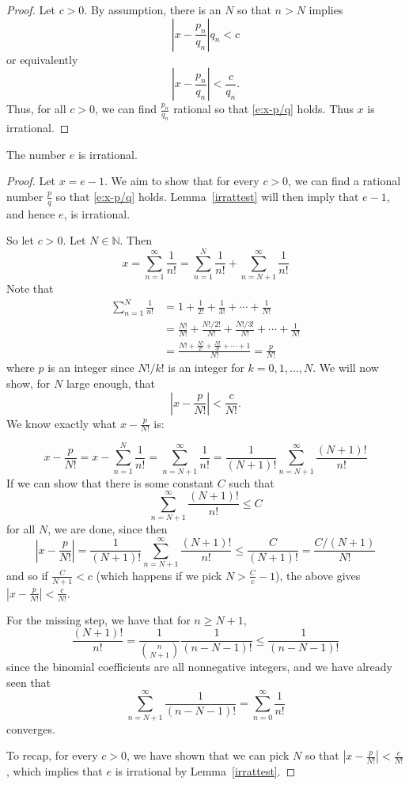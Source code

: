 \documentclass[11pt,dvipsnames]{book}
\numberwithin{equation}{section} %
\numberwithin{figure}{section} %
\numberwithin{table}{section} %
\begin{document}
\begin{proof}
Let $c>0$. By assumption,
there is an $N$ so that $n> N$ implies 
\[
\left|x-\frac{p_{n}}{q_{n}}\right|q_n<c \]
or equivalently
\[\left|x-\frac{p_{n}}{q_{n}}\right| < \frac{c}{q_n}.
\]
Thus, for all $c>0$, we can find $\frac{p_n}{q_n}$ rational so that \eqref{e:x-p/q} holds. Thus $x$ is irrational.
\end{proof}

\begin{theorem}
The number $e$ is irrational. 
\end{theorem}

\begin{proof}
Let $x = e-1$. We aim to show that for every $c>0$, we can find a rational number $\frac{p}{q}$ so that \eqref{e:x-p/q} holds. Lemma~\ref{irrattest} will then imply that $e-1$, and hence $e$, is irrational.

So let $c>0$. Let $N\in\mathbb{N}$. Then
\[
x=\sum_{n=1}^{\infty} \frac{1}{n!}
=\sum_{n=1}^{N}\frac{1}{n!} + \sum_{n=N+1}^{\infty}\frac{1}{n!}
\]
Note that 
\begin{align*}
\sum_{n=1}^{N}\frac{1}{n!} 
& =1+\frac{1}{2!}+\frac{1}{3!}+\cdots + \frac{1}{N!}\\
& = \frac{N!}{N!}+\frac{N!/2!}{N!}+\frac{N!/3!}{N!}+\cdots + \frac{1}{N!}\\
& = \frac{N!+\frac{N!}{2!}+\frac{N!}{3!}+\cdots + 1}{N!} = \frac{p}{N!}
\end{align*}
where $p$ is an integer since $N!/k!$ is an integer for $k=0,1,...,N$. We will now show, for $N$ large enough, that 
\[
\left| x-\frac{p}{N!}\right|<\frac{c}{N!}.\]
We know exactly what $x-\frac{p}{N!}$ is:

\[
x-\frac{p}{N!}
=x-\sum_{n=1}^{N}\frac{1}{n!} 
=\sum_{n=N+1}^{\infty}\frac{1}{n!}
=\frac{1}{(N+1)!}\sum_{n=N+1}^{\infty}\frac{(N+1)!}{n!}
\]
If we can show that there is some constant $C$ such that \[\sum_{n=N+1}^{\infty}\frac{(N+1)!}{n!} \leq C\]
for all $N$, we are done, since then
\[
\left|x-\frac{p}{N!}\right|
=\frac{1}{(N+1)!}\sum_{n=N+1}^{\infty}\frac{(N+1)!}{n!}
\leq \frac{C}{(N+1)!}=\frac{C/(N+1)}{N!}
\]
and so if $\frac{C}{N+1}<c$ (which happens if we pick $N>\frac{C}{c}-1$), the above gives $\left|x-\frac{p}{N!}\right|<\frac{c}{N!}$. 

\medskip
For the missing step, we have that for $n \geq N+1$,
\[ \frac{(N+1)!}{n!} =
\frac{1}{{n\choose N+1}}
\frac{1}{(n-N-1)!}
\leq \frac{1}{(n-N-1)!}
\]
since the binomial coefficients are all nonnegative integers, and we have already seen that 
\[ \sum_{n = N+1}^\infty \frac{1}{(n-N-1)!} = \sum_{n=0}^\infty\frac{1}{n!}\] 
converges.

To recap, for every $c>0$, we have shown that we can pick $N$ so that $\left|x-\frac{p}{N!}\right|<\frac{c}{N!}$, which implies that $e$ is irrational by Lemma~\ref{irrattest}.
\end{proof}
\end{document}
